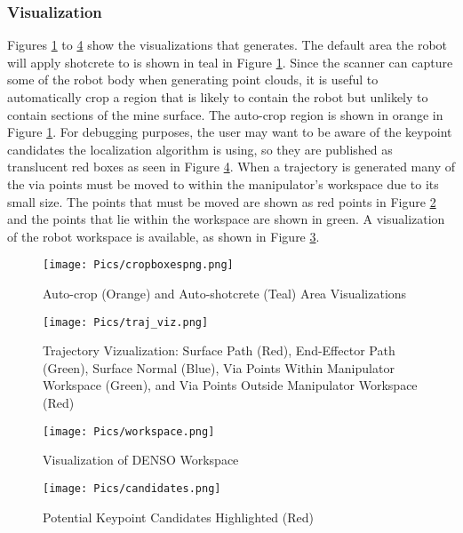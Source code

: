 \subsubsection{Visualization}
Figures \ref{fig:cropb} to \ref{fig:cands} show the visualizations that  generates. The default area the robot will apply shotcrete to is shown in teal in Figure \ref{fig:cropb}. Since the scanner can capture some of the robot body when generating point clouds, it is useful to automatically crop a region that is likely to contain the robot but unlikely to contain sections of the mine surface. The auto-crop region is shown in orange in Figure \ref{fig:cropb}. For debugging purposes, the user may want to be aware of the keypoint candidates the localization algorithm is using, so they are published as translucent red boxes as seen in Figure \ref{fig:cands}. When a trajectory is generated many of the via points must be moved to within the manipulator's workspace due to its small size. The points that must be moved are shown as red points in Figure \ref{fig:trajviz} and the points that lie within the workspace are shown in green. A visualization of the robot workspace is available, as shown in Figure \ref{fig:worksp}.\\
\begin{figure}[h]
    \centering
    \texttt{[image: Pics/cropboxespng.png]}
    \caption{Auto-crop (Orange) and Auto-shotcrete (Teal) Area Visualizations}
    \label{fig:cropb}
\end{figure}
\begin{figure}[h]
    \centering
    \texttt{[image: Pics/traj\_viz.png]}
    \caption{Trajectory Vizualization: Surface Path (Red), End-Effector Path (Green), Surface Normal (Blue), Via Points Within Manipulator Workspace (Green), and Via Points Outside Manipulator Workspace (Red)}
    \label{fig:trajviz}
\end{figure}
\begin{figure}[h]
    \centering
    \texttt{[image: Pics/workspace.png]}
    \caption{Visualization of DENSO Workspace}
    \label{fig:worksp}
\end{figure}
\begin{figure}[h]
    \centering
    \texttt{[image: Pics/candidates.png]}
    \caption{Potential Keypoint Candidates Highlighted (Red)}
    \label{fig:cands}
\end{figure}
\clearpage
